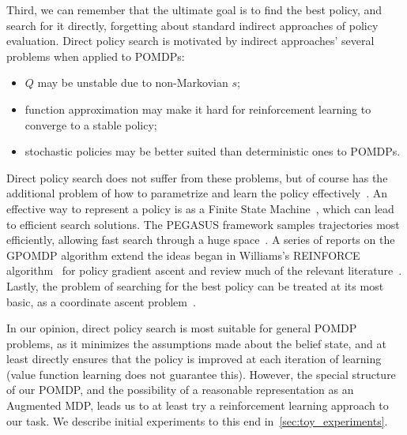 Third, we can remember that the ultimate goal is to find the best policy, and search for it directly, forgetting about standard indirect approaches of policy evaluation.
Direct policy search is motivated by indirect approaches' several problems when applied to POMDPs:
\begin{itemize}
  \item $Q$ may be unstable due to non-Markovian $s$; 
  \item function approximation may make it hard for reinforcement learning to converge to a stable policy;
  \item stochastic policies may be better suited than deterministic ones to POMDPs.
\end{itemize}

Direct policy search does not suffer from these problems, but of course has the additional problem of how to parametrize and learn the policy effectively~\cite{Murphy2000,Hauskrecht2000}.
An effective way to represent a policy is as a Finite State Machine~\cite{Hansen1998}, which can lead to efficient search solutions.
The PEGASUS framework samples trajectories most efficiently, allowing fast search through a huge space~\cite{Ng2000}.
A series of reports on the GPOMDP algorithm extend the ideas began in Williams's REINFORCE algorithm~\cite{Williams1992} for policy gradient ascent and review much of the relevant literature~\cite{Baxter1999,Baxter1999a}.
Lastly, the problem of searching for the best policy can be treated at its most basic, as a coordinate ascent problem~\cite{Kohl2004}.

In our opinion, direct policy search is most suitable for general POMDP problems, as it minimizes the assumptions made about the belief state, and at least directly ensures that the policy is improved at each iteration of learning (value function learning does not guarantee this).
However, the special structure of our POMDP, and the possibility of a reasonable representation as an Augmented MDP, leads us to at least try a reinforcement learning approach to our task.
We describe initial experiments to this end in~\autoref{sec:toy_experiments}.